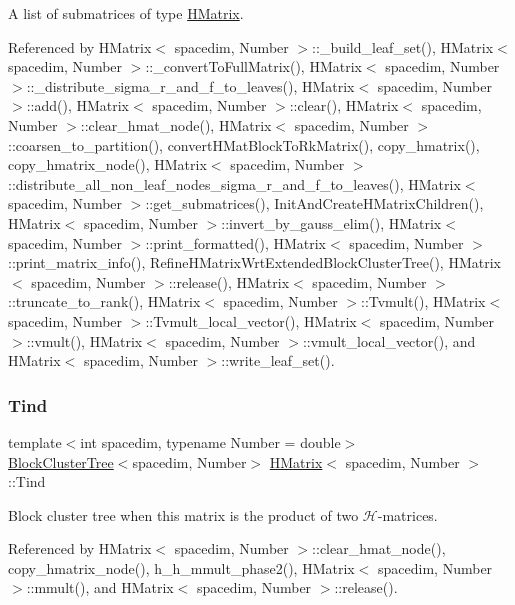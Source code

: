 A list of submatrices of type \hyperlink{classHMatrix}{H\+Matrix}. 

Referenced by H\+Matrix$<$ spacedim, Number $>$\+::\+\_\+build\+\_\+leaf\+\_\+set(), H\+Matrix$<$ spacedim, Number $>$\+::\+\_\+convert\+To\+Full\+Matrix(), H\+Matrix$<$ spacedim, Number $>$\+::\+\_\+distribute\+\_\+sigma\+\_\+r\+\_\+and\+\_\+f\+\_\+to\+\_\+leaves(), H\+Matrix$<$ spacedim, Number $>$\+::add(), H\+Matrix$<$ spacedim, Number $>$\+::clear(), H\+Matrix$<$ spacedim, Number $>$\+::clear\+\_\+hmat\+\_\+node(), H\+Matrix$<$ spacedim, Number $>$\+::coarsen\+\_\+to\+\_\+partition(), convert\+H\+Mat\+Block\+To\+Rk\+Matrix(), copy\+\_\+hmatrix(), copy\+\_\+hmatrix\+\_\+node(), H\+Matrix$<$ spacedim, Number $>$\+::distribute\+\_\+all\+\_\+non\+\_\+leaf\+\_\+nodes\+\_\+sigma\+\_\+r\+\_\+and\+\_\+f\+\_\+to\+\_\+leaves(), H\+Matrix$<$ spacedim, Number $>$\+::get\+\_\+submatrices(), Init\+And\+Create\+H\+Matrix\+Children(), H\+Matrix$<$ spacedim, Number $>$\+::invert\+\_\+by\+\_\+gauss\+\_\+elim(), H\+Matrix$<$ spacedim, Number $>$\+::print\+\_\+formatted(), H\+Matrix$<$ spacedim, Number $>$\+::print\+\_\+matrix\+\_\+info(), Refine\+H\+Matrix\+Wrt\+Extended\+Block\+Cluster\+Tree(), H\+Matrix$<$ spacedim, Number $>$\+::release(), H\+Matrix$<$ spacedim, Number $>$\+::truncate\+\_\+to\+\_\+rank(), H\+Matrix$<$ spacedim, Number $>$\+::\+Tvmult(), H\+Matrix$<$ spacedim, Number $>$\+::\+Tvmult\+\_\+local\+\_\+vector(), H\+Matrix$<$ spacedim, Number $>$\+::vmult(), H\+Matrix$<$ spacedim, Number $>$\+::vmult\+\_\+local\+\_\+vector(), and H\+Matrix$<$ spacedim, Number $>$\+::write\+\_\+leaf\+\_\+set().

\mbox{\label{classHMatrix_a12da9454687e5ca15837d63e2bf0b595}} 
\subsubsection{\texorpdfstring{Tind}{Tind}}
{\footnotesize\ttfamily template$<$int spacedim, typename Number = double$>$ \\
\hyperlink{classBlockClusterTree}{Block\+Cluster\+Tree}$<$spacedim, Number$>$ \hyperlink{classHMatrix}{H\+Matrix}$<$ spacedim, Number $>$\+::Tind\hspace{0.3cm}{\ttfamily [private]}}

Block cluster tree when this matrix is the product of two $\mathcal{H}$-\/matrices. 

Referenced by H\+Matrix$<$ spacedim, Number $>$\+::clear\+\_\+hmat\+\_\+node(), copy\+\_\+hmatrix\+\_\+node(), h\+\_\+h\+\_\+mmult\+\_\+phase2(), H\+Matrix$<$ spacedim, Number $>$\+::mmult(), and H\+Matrix$<$ spacedim, Number $>$\+::release().


